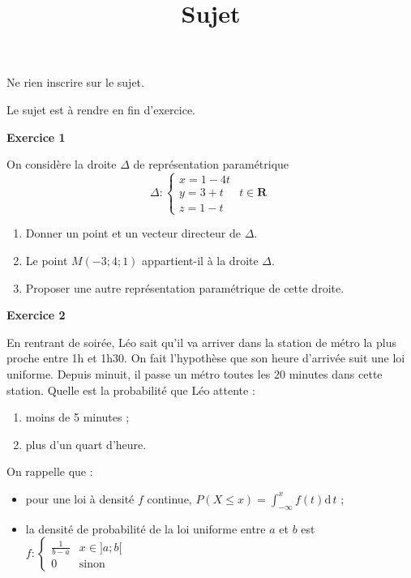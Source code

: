 \documentclass[12pt,a4paper,french]{article}
\author{}
\title{Sujet \no{5}}
\date{}
\begin{document}
\maketitle
\begin{center}Ne rien inscrire sur le sujet.

  Le sujet est à rendre en fin d'exercice.
\end{center}

\bigskip

\textbf{Exercice 1}

On considère la droite $\Delta$ de représentation paramétrique \[ \Delta
  : \left\lbrace \begin{array}{lr} x = 1 - 4t & \\ y = 3 + t & t\in
\mathbf{R} \\ z = 1 - t & \end{array}\right. \]

\begin{enumerate}
  \item Donner un point et un vecteur directeur de $\Delta$.
  \item Le point $M (-3;4;1)$ appartient-il à la droite $\Delta$.
  \item Proposer une autre représentation paramétrique de cette droite.
\end{enumerate}

\medskip

\textbf{Exercice 2}

En rentrant de soirée, Léo sait qu'il va arriver dans la station de
métro la plus proche entre 1h et 1h30. On fait l'hypothèse que son heure
d'arrivée suit une loi uniforme. Depuis minuit, il passe un métro toutes
les 20 minutes dans cette station. Quelle est la probabilité que Léo
attente :
\begin{enumerate}
  \item moins de 5 minutes ;
  \item plus d'un quart d'heure.
\end{enumerate}

On rappelle que :
\begin{itemize}
  \item pour une loi à densité $f$ continue, $P(X \leq x) =
    \int_{-\infty}^x f(t) \mathrm{d}\,t$ ;
  \item la densité de probabilité de la loi uniforme entre $a$ et $b$
    est $f : \left\lbrace \begin{array}{lr} \frac1{b-a} & x \in ]a;b[
    \\ 0 & \text{sinon}\end{array}\right.$
\end{itemize}
\end{document}
